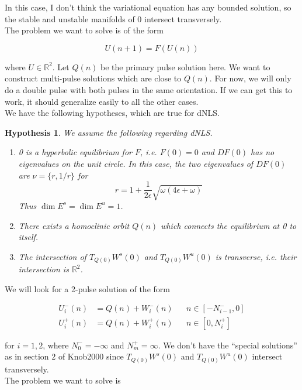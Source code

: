 \documentclass[12pt]{article}
\def\R{{\mathbb R}}
\newtheorem{hypothesis}{Hypothesis}
\begin{document}
In this case, I don't think the variational equation has any bounded solution, so the stable and unstable manifolds of 0 intersect transversely.\\

The problem we want to solve is of the form 

\begin{equation}\label{diffeq}
U(n+1) = F(U(n))
\end{equation}

where $U \in \R^2$. Let $Q(n)$ be the primary pulse solution here. We want to construct multi-pulse solutions which are close to $Q(n)$. For now, we will only do a double pulse with both pulses in the same orientation. If we can get this to work, it should generalize easily to all the other cases. \\

We have the following hypotheses, which are true for dNLS.

\begin{hypothesis}\label{2hyp}
We assume the following regarding dNLS.
\begin{enumerate}[(0)]
\item 0 is a hyperbolic equilibrium for $F$, i.e. $F(0) = 0$ and $DF(0)$ has no eigenvalues on the unit circle. In this case, the two eigenvalues of $DF(0)$ are $\nu = \{ r, 1/r \}$ for
\[
r = 1 + \frac{1}{2\epsilon}\sqrt{ \omega(4 \epsilon + \omega)}
\]
Thus $\dim E^s = \dim E^u = 1$.
\item There exists a homoclinic orbit $Q(n)$ which connects the equilibrium at 0 to itself.
\item The intersection of $T_{Q(0)} W^s(0)$ and $T_{Q(0)}W^u(0)$ is transverse, i.e. their intersection is $\R^2$. 
\end{enumerate}
\end{hypothesis}

We will look for a 2-pulse solution of the form

\begin{align*}
U_i^-(n) &= Q(n) + W_i^-(n) && n \in [-N_{i-1}^-, 0] \\
U_i^+(n) &= Q(n) + W_i^+(n) && n \in [0, N_i^+]
\end{align*}

for $i = 1, 2$, where $N_0^- = -\infty$ and $N_m^+ = \infty$. We don't have the ``special solutions'' as in section 2 of Knob2000 since $T_{Q(0)} W^s(0)$ and $T_{Q(0)}W^u(0)$ intersect transversely.\\

The problem we want to solve is
\end{document}
